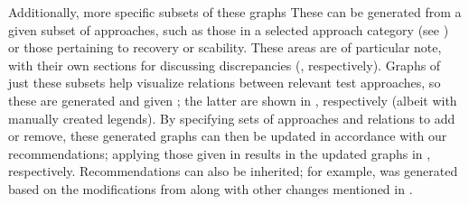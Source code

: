     Additionally, more specific subsets of these graphs \else These \fi
can be generated from a given subset of approaches, such as
\ifnotpaper\else those in a selected approach category (see
    ) or \fi those pertaining to recovery or
scability\ifnotpaper. These areas are of particular note, with their own
sections for discussing discrepancies (,
respectively). Graphs of just these subsets help visualize relations
between relevant test approaches, so these are generated and given
\else; the latter are shown \fi in , respectively (albeit with manually created
legends). By specifying sets of approaches and relations to add or remove,
these generated graphs can then be updated in accordance with our
recommendations; applying those given in  results in the updated graphs in
, respectively.
\ifnotpaper
    Recommendations can also be inherited; for example,
     was generated based on the modifications from
     along with
    other changes mentioned in .
\fi

\ifnotpaper
    
\else
    \sntxDiscrepsTable{}
    \smntcDiscrepsTable{}
\fi
